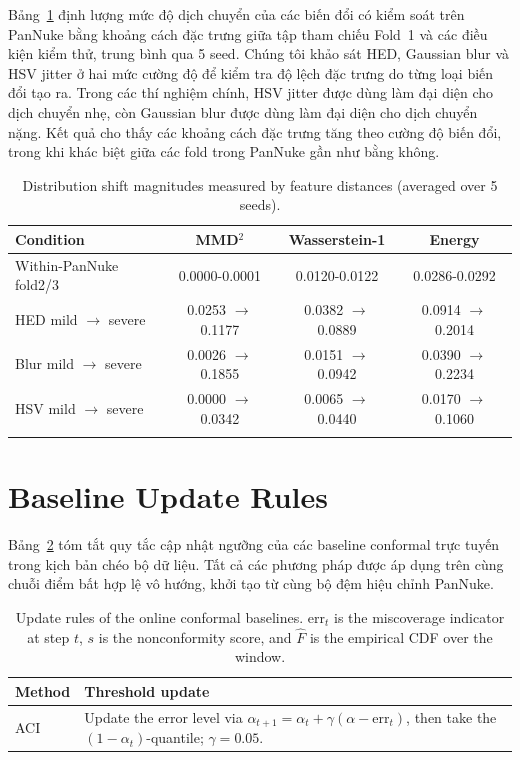 \documentclass[pdflatex,sn-mathphys-num]{sn-jnl}
\begin{document}
\begin{appendices}
Bảng~\ref{tab:shift} định lượng mức độ dịch chuyển của các biến đổi có kiểm soát trên
PanNuke bằng khoảng cách đặc trưng giữa tập tham chiếu Fold~1 và các điều kiện kiểm
thử, trung bình qua 5 seed. Chúng tôi khảo sát HED, Gaussian blur và HSV jitter ở hai
mức cường độ để kiểm tra độ lệch đặc trưng do từng loại biến đổi tạo ra. Trong các thí
nghiệm chính, HSV jitter được dùng làm đại diện cho dịch chuyển nhẹ, còn Gaussian blur
được dùng làm đại diện cho dịch chuyển nặng. Kết quả cho thấy các khoảng cách đặc
trưng tăng theo cường độ biến đổi, trong khi khác biệt giữa các fold trong PanNuke gần
như bằng không.
\begin{table}[htbp]
\caption{Distribution shift magnitudes measured by feature distances (averaged over
5 seeds).}
\label{tab:shift}
\centering
\begin{tabular}{@{}lccc@{}}
\toprule
Condition & MMD$^2$ & Wasserstein-1 & Energy \\
\midrule
Within-PanNuke fold2/3
& 0.0000-0.0001 & 0.0120-0.0122 & 0.0286-0.0292 \\
HED mild $\to$ severe
& 0.0253 $\to$ 0.1177 & 0.0382 $\to$ 0.0889 & 0.0914 $\to$ 0.2014 \\
Blur mild $\to$ severe
& 0.0026 $\to$ 0.1855 & 0.0151 $\to$ 0.0942 & 0.0390 $\to$ 0.2234 \\
HSV mild $\to$ severe
& 0.0000 $\to$ 0.0342 & 0.0065 $\to$ 0.0440 & 0.0170 $\to$ 0.1060 \\
\botrule
\end{tabular}
\end{table}

\section{Baseline Update Rules}\label{secA:baselines}

Bảng~\ref{tab:baselines} tóm tắt quy tắc cập nhật ngưỡng của các baseline conformal
trực tuyến trong kịch bản chéo bộ dữ liệu. Tất cả các phương pháp được áp dụng trên
cùng chuỗi điểm bất hợp lệ vô hướng, khởi tạo từ cùng bộ đệm hiệu chỉnh PanNuke.

\begin{table}[htbp]
\caption{Update rules of the online conformal baselines.
\(\mathrm{err}_t\) is the miscoverage indicator at step \(t\), \(s\) is the
nonconformity score, and \(\hat{F}\) is the empirical CDF over the window.}
\label{tab:baselines}
\centering
\small
\begin{tabularx}{\textwidth}{@{}lX@{}}
\toprule
Method & Threshold update \\
\midrule
ACI~\cite{gibbs2021adaptive}
& Update the error level via
\(\alpha_{t+1}=\alpha_t+\gamma(\alpha-\mathrm{err}_t)\), then take the
\((1-\alpha_t)\)-quantile; \(\gamma=0.05\). \\


\end{tabularx}
\end{table}
\end{appendices}
\end{document}
